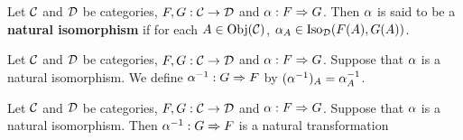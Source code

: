 \documentclass{book}
\begin{document}
	\begin{defn} 
		Let $\mathcal{C}$ and $\mathcal{D}$ be categories, $F,G : \mathcal{C} \rightarrow \mathcal{D}$ and $\alpha: F \Rightarrow G$. Then $\alpha$ is said to be a \textbf{natural isomorphism} if for each $A \in \operatorname{Obj}(\mathcal{C})$, $\alpha_A \in \operatorname{Iso}_{\mathcal{D}}(F(A), G(A))$. 
	\end{defn}
	
	\begin{defn} 
		Let $\mathcal{C}$ and $\mathcal{D}$ be categories, $F,G: \mathcal{C} \rightarrow \mathcal{D}$ and $\alpha : F \Rightarrow G$. Suppose that $\alpha$ is a natural isomorphism. We define $\alpha^{-1}: G \Rightarrow F$ by $(\alpha^{-1})_A = \alpha_A^{-1}$. 
	\end{defn}
	
	\begin{ex} 
		Let $\mathcal{C}$ and $\mathcal{D}$ be categories, $F,G: \mathcal{C} \rightarrow \mathcal{D}$ and $\alpha : F \Rightarrow G$. Suppose that $\alpha$ is a natural isomorphism. Then $\alpha^{-1}: G \Rightarrow F$ is a natural transformation
	\end{ex}
	
\end{document}
